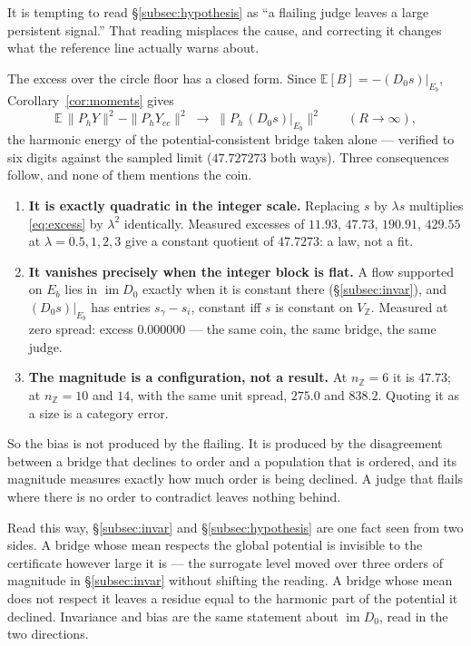 \documentclass[11pt,a4paper]{article}
\theoremstyle{definition}
\theoremstyle{remark}
\newcommand{\Z}{\mathbb{Z}}
\newcommand{\im}{\operatorname{im}}
\newcommand{\Ph}{P_h}
\begin{document}
It is tempting to read \S\ref{subsec:hypothesis} as ``a flailing judge leaves a
large persistent signal.'' That reading misplaces the cause, and correcting it
changes what the reference line actually warns about.

The excess over the circle floor has a closed form. Since
$\mathbb{E}[B]=-(D_0s)|_{E_b}$, Corollary~\ref{cor:moments} gives
\begin{equation}
\mathbb{E}\,\|\Ph Y\|^2-\|\Ph Y_{cc}\|^2
\;\longrightarrow\;
\bigl\|\Ph\,(D_0s)|_{E_b}\bigr\|^2
\qquad (R\to\infty),
\label{eq:excess}
\end{equation}
the harmonic energy of the potential-consistent bridge taken alone --- verified
to six digits against the sampled limit ($47.727273$ both ways). Three
consequences follow, and none of them mentions the coin.

\begin{enumerate}[label=(\roman*),leftmargin=2.2em]
\item \textbf{It is exactly quadratic in the integer scale.} Replacing $s$ by
$\lambda s$ multiplies \eqref{eq:excess} by $\lambda^2$ identically. Measured
excesses of $11.93$, $47.73$, $190.91$, $429.55$ at $\lambda=0.5,1,2,3$ give a
constant quotient of $47.7273$: a law, not a fit.

\item \textbf{It vanishes precisely when the integer block is flat.} A flow
supported on $E_b$ lies in $\im D_0$ exactly when it is constant there
(\S\ref{subsec:invar}), and $(D_0s)|_{E_b}$ has entries $s_\gamma-s_i$, constant
iff $s$ is constant on $V_{\Z}$. Measured at zero spread: excess $0.000000$ ---
the same coin, the same bridge, the same judge.

\item \textbf{The magnitude is a configuration, not a result.} At
$n_{\Z}=6$ it is $47.73$; at $n_{\Z}=10$ and $14$, with the same unit spread,
$275.0$ and $838.2$. Quoting it as a size is a category error.
\end{enumerate}

So the bias is not produced by the flailing. It is produced by the disagreement
between a bridge that declines to order and a population that is ordered, and its
magnitude measures exactly how much order is being declined. A judge that flails
where there is no order to contradict leaves nothing behind.

Read this way, \S\ref{subsec:invar} and \S\ref{subsec:hypothesis} are one fact
seen from two sides. A bridge whose mean respects the global potential is
invisible to the certificate however large it is --- the surrogate level moved
over three orders of magnitude in \S\ref{subsec:invar} without shifting the
reading. A bridge whose mean does not respect it leaves a residue equal to the
harmonic part of the potential it declined. Invariance and bias are the same
statement about $\im D_0$, read in the two directions.
\end{document}
